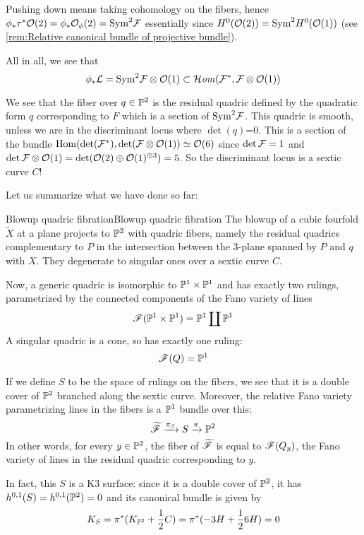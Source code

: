 Pushing down means taking cohomology on the fibers, hence $\phi_* \tau^* \O(2)=\phi_* \O_\phi(2)=\mathrm{Sym}^2 \calF$ essentially since $H^0(\O(2))=\mathrm{Sym}^2 H^0(\O(1))$ (see \ref{rem:Relative canonical bundle of projective bundle}).

All in all, we see that $$\phi_* \calL = \mathrm{Sym}^2 \calF \otimes \O(1)\subset\lHom (\calF^* , \calF \otimes \O(1))$$

We see that the fiber over $q \in \P^2$ is the residual quadric defined by the quadratic form $q$ corresponding to $F$ which is a section of $\mathrm{Sym}^2\calF$. This quadric is smooth, unless we are in the discriminant locus where $\det(q)$=0. This is a section of the bundle $\Hom(\det(\calF^*), \det (\calF\otimes \O(1))\simeq \O(6) $ since $\det \calF=1$ and $\det \calF\otimes \O(1)= \det (\O(2) \oplus \O(1)^{\oplus 3})=5$. So the discriminant locus is a sextic curve $C$!

Let us summarize what we have done so far:

\begin{proposition}{Blowup quadric fibration}{Blowup quadric fibration}
    The blowup of a cubic fourfold $\tilde{X}$ at a plane projects to $\P^2$ with quadric fibers, namely the residual quadrics complementary to $P$ in the intersection between the 3-plane spanned by $P$ and $q$ with $X$. They degenerate to singular ones over a sextic curve $C$.
\end{proposition}


Now, a generic quadric is isomorphic to $\P^1 \times \P^1$ and has exactly two rulings, parametrized by the connected components of the Fano variety of lines $$\scrF(\P^1 \times \P^1)=\P^1 \coprod \P^1$$
A singular quadric is a cone, so has exactly one ruling: $$\scrF(Q)=\P^1$$

If we define $S$ to be the space of rulings on the fibers, we see that it is a double cover of $\P^2$ branched along the sextic curve. Moreover, the relative Fano variety parametrizing lines in the fibers is a $\P^1$ bundle over this: $$\tscrF \xrightarrow{\pi_S} S \xrightarrow{\pi} \P^2$$
In other words, for every $y\in \P^2$, the fiber of $\tscrF$ is equal to $\scrF(Q_y)$, the Fano variety of lines in the residual quadric corresponding to $y$.

In fact, this $S$ is a K3 surface: since it is a double cover of $\P^2$, it has $h^{0,1}(S)=h^{0,1}(\P^2)=0$ and its canonical bundle is given by $$K_S = \pi^*(K_{\P^2}+\frac{1}{2}C)=\pi^*(-3H +\frac{1}{2}6H)=0$$

